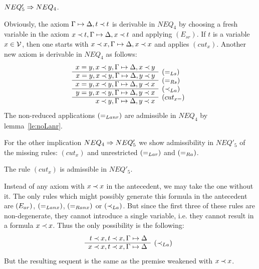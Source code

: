 %
\begin{LEMMA}\label{le:neq5toneq4}
$NEQ'_5\mathrel\Rightarrow NEQ_4$.
\end{LEMMA}
\begin{PROOF}
Obviously, the axiom $\Gamma\mathrel{\mapsto}\Delta, t\mathbin{\prec} t$ is derivable in $NEQ_4$ by choosing a fresh
variable in the axiom $x\mathbin{\prec} t,\Gamma\mathrel{\mapsto}\Delta, x\mathbin{\prec} t$ and applying $(E_{sr})$. 
If $t$ is a variable $x\in{\cal V}$,
then one starts with $x\mathbin{\prec} x,\Gamma\mathrel{\mapsto}\Delta, x\mathbin{\prec} x$ and applies $(cut_x)$.
Another new axiom is derivable in $NEQ_4$ as follows:
\[\prarc{
x=y, x\Incl y, \GSD, x\Incl y \cl
x=y, x\Incl y, \GSD, y\Incl y & \rabove{\eLs} \cl
x=y, x\Incl y, \GSD, y\Incl x & \rabove{\eRs} \cl
y=y, x\Incl y, \GSD, y\Incl x & \rabove{\iLa} \cl
     x\Incl y, \GSD, y\Incl x & \rabove{(cut_{x=})}
}
\]
The non-reduced applications $(=_{Lanr})$ are admissible in $NEQ_4$ by lemma~\ref{le:noLanr}.
\end{PROOF}

\noindent
For the other implication $NEQ_4\mathrel\Rightarrow NEQ'_5$ we show admissibility in $NEQ'_5$
of the missing rules: %
$(cut_x)$ %
and unrestricted $(=_{Lar})$ and $(=_{Ra})$.

\begin{LEMMA}\label{le:noxeq}
The rule $(cut_x)$ is admissible in $NEQ'_5$.
\end{LEMMA}
\begin{PROOF}
Instead of any axiom with $x\mathbin{\prec} x$ in the antecedent, we may
take the one without it. The only rules which might possibly generate this formula in the
antecedent are $(E_{ar})$, $(=_{Lanx})$, $(=_{Ranx})$ or $(\mathbin{\prec}_{La})$. 
But since the first three of these rules are non-degenerate, they cannot introduce 
a single variable, 
i.e. they cannot result in a formula $x\mathbin{\prec} x$. Thus the only possibility is the
following:
\[\prar{t\Incl x, t\Incl x, \GSD \cl
x\Incl x, t\Incl x, \GSD & \rabove{\iLa}
}
\]
But the resulting sequent is the same as the premise weakened with $x\mathbin{\prec} x$.
\end{PROOF}

